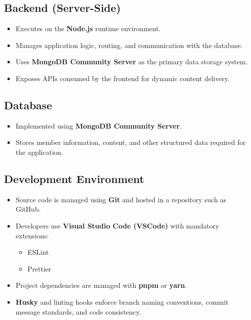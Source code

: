 \documentclass[12pt]{article}
\begin{document}
    \subsection{Backend (Server-Side)}
    \begin{itemize}
        \item Executes on the \textbf{Node.js} runtime environment.
        \item Manages application logic, routing, and communication with the database.
        \item Uses \textbf{MongoDB Community Server} as the primary data storage system.
        \item Exposes APIs consumed by the frontend for dynamic content delivery.
    \end{itemize}

    \subsection{Database}
    \begin{itemize}
        \item Implemented using \textbf{MongoDB Community Server}.
        \item Stores member information, content, and other structured data required for the application.
    \end{itemize}

    \subsection{Development Environment}
    \begin{itemize}
        \item Source code is managed using \textbf{Git} and hosted in a repository such as GitHub.
        \item Developers use \textbf{Visual Studio Code (VSCode)} with mandatory extensions:
        \begin{itemize}
            \item ESLint
            \item Prettier
        \end{itemize}
        \item Project dependencies are managed with \textbf{pnpm} or \textbf{yarn}.
        \item \textbf{Husky} and linting hooks enforce branch naming conventions, commit message standards, and code consistency.
    \end{itemize}
\end{document}

